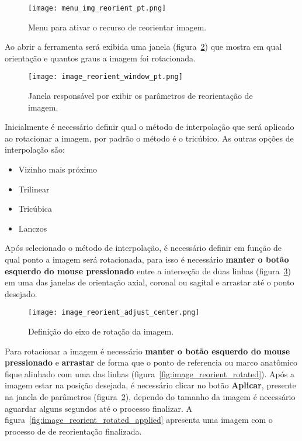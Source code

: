 \begin{figure}[!htbp]
\centering
\texttt{[image: menu\_img\_reorient\_pt.png]}
\caption{Menu para ativar o recurso de reorientar imagem.}
\label{fig:menu_img_reorient}
\end{figure}

Ao abrir a ferramenta será exibida uma janela (figura~\ref{fig:image_reorient_window}) que mostra em qual orientação e quantos graus a imagem foi rotacionada.

\begin{figure}[!htbp]
\centering
\texttt{[image: image\_reorient\_window\_pt.png]}
\caption{Janela responsável por exibir os parâmetros de reorientação de imagem.}
\label{fig:image_reorient_window}
\end{figure}

\newpage

Inicialmente é necessário definir qual o método de interpolação que será aplicado ao rotacionar a imagem, por padrão o método é o tricúbico. As outras opções de interpolação são:

\begin{itemize}
	\item Vizinho mais próximo
	\item Trilinear
	\item Tricúbica
	\item Lanczos
\end{itemize}

Após selecionado o método de interpolação, é necessário definir em função de qual ponto a imagem será rotacionada, para isso é necessário \textbf{manter o botão esquerdo do mouse pressionado} entre a interseção de duas linhas (figura~\ref{fig:image_reorient_adjust_center}) em uma das janelas de orientação axial, coronal ou sagital e arrastar até o ponto desejado.

\begin{figure}[!htbp]
\centering
\texttt{[image: image\_reorient\_adjust\_center.png]}
\caption{Definição do eixo de rotação da imagem.}
\label{fig:image_reorient_adjust_center}
\end{figure}

Para rotacionar a imagem é necessário \textbf{manter o botão esquerdo do mouse pressionado} e \textbf{arrastar} de forma que o ponto de referencia ou marco anatômico fique alinhado com uma das linhas (figura~\ref{fig:image_reorient_rotated}). Após a imagem estar na posição desejada, é necessário clicar no botão \textbf{Aplicar}, presente na janela de parâmetros (figura~\ref{fig:image_reorient_window}), dependo do tamanho da imagem é necessário aguardar alguns segundos até o processo finalizar. A figura~\ref{fig:image_reorient_rotated_applied} apresenta uma imagem com o processo de de reorientação finalizada.

